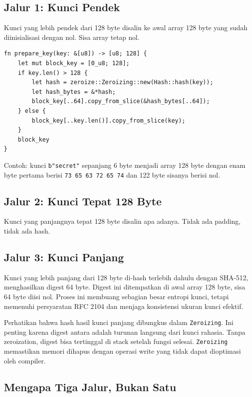 \documentclass[11pt,a4paper]{article}
\begin{document}
\subsection{Jalur 1: Kunci Pendek}

Kunci yang lebih pendek dari 128 byte disalin ke awal array 128 byte yang sudah diinisialisasi dengan nol. Sisa array tetap nol.

\begin{lstlisting}[style=code]
fn prepare_key(key: &[u8]) -> [u8; 128] {
    let mut block_key = [0_u8; 128];
    if key.len() > 128 {
        let hash = zeroize::Zeroizing::new(Hash::hash(key));
        let hash_bytes = &*hash;
        block_key[..64].copy_from_slice(&hash_bytes[..64]);
    } else {
        block_key[..key.len()].copy_from_slice(key);
    }
    block_key
}
\end{lstlisting}

Contoh: kunci \texttt{b"secret"} sepanjang 6 byte menjadi array 128 byte dengan enam byte pertama berisi \texttt{73 65 63 72 65 74} dan 122 byte sisanya berisi nol.

\subsection{Jalur 2: Kunci Tepat 128 Byte}

Kunci yang panjangnya tepat 128 byte disalin apa adanya. Tidak ada padding, tidak ada hash.

\subsection{Jalur 3: Kunci Panjang}

Kunci yang lebih panjang dari 128 byte di-hash terlebih dahulu dengan SHA-512, menghasilkan digest 64 byte. Digest ini ditempatkan di awal array 128 byte, sisa 64 byte diisi nol. Proses ini membuang sebagian besar entropi kunci, tetapi memenuhi persyaratan RFC 2104 dan menjaga konsistensi ukuran kunci efektif.

Perhatikan bahwa hash hasil kunci panjang dibungkus dalam \texttt{Zeroizing}. Ini penting karena digest antara adalah turunan langsung dari kunci rahasia. Tanpa zeroization, digest bisa tertinggal di stack setelah fungsi selesai. \texttt{Zeroizing} memastikan memori dihapus dengan operasi write yang tidak dapat dioptimasi oleh compiler.

\subsection{Mengapa Tiga Jalur, Bukan Satu}
\end{document}
